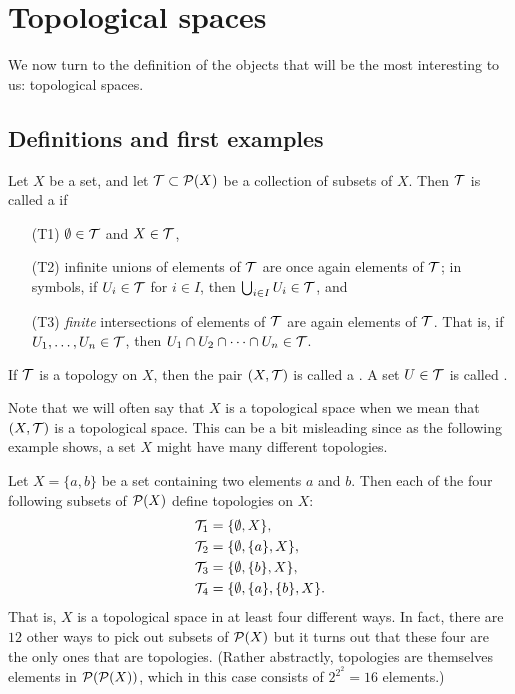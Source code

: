 \section{Topological spaces}
\label{topological-spaces}
We now turn to the definition of the objects that will be the most interesting to us: topological spaces.

\subsection{Definitions and first examples}
\begin{defn}
  Let $X$ be a set, and let $\mathcal{T} \subset \mathcal{P}(X)$ be a collection of subsets of $X$. Then $\mathcal{T}$ is called a  if
  \begin{enumerate}
    \item[(T1)] $\emptyset \in \mathcal{T}$ and $X \in \mathcal{T}$,
    \item[(T2)] infinite unions of elements of $\mathcal{T}$ are once again elements of $\mathcal{T}$; in symbols, if $U_i \in \mathcal{T}$ for $i \in I$, then $\bigcup_{i \in I} U_i \in \mathcal{T}$, and
    \item[(T3)] \emph{finite} intersections of elements of $\mathcal{T}$ are again elements of $\mathcal{T}$. That is, if $U_1, \dots, U_n \in \mathcal{T}$, then $U_1 \cap U_2 \cap \dots \cap U_n \in \mathcal{T}$.
  \end{enumerate}
  If $\mathcal{T}$ is a topology on $X$, then the pair $(X,\mathcal{T})$ is called a . A set $U \in \mathcal{T}$ is called .
\end{defn}
Note that we will often say that $X$ is a topological space when we mean that $(X,\mathcal{T})$ is a topological space. This can be a bit misleading since as the following example shows, a set $X$ might have many different topologies.
\begin{example}
  \label{two-point-topologies}
  Let $X = \{a,b\}$ be a set containing two elements $a$ and $b$. Then each of the four following subsets of $\mathcal{P}(X)$ define topologies on $X$:
  \begin{align*}
    \mathcal{T}_1 &= \{\emptyset,X\},\\
    \mathcal{T}_2 &= \{\emptyset, \{a\}, X\},\\
    \mathcal{T}_3 &= \{\emptyset, \{b\}, X\}, \\
    \mathcal{T}_4 &= \{\emptyset,\{a\},\{b\},X\}.
  \end{align*}
  That is, $X$ is a topological space in at least four different ways. In fact, there are $12$ other ways to pick out subsets of $\mathcal{P}(X)$ but it turns out that these four are the only ones that are topologies. (Rather abstractly, topologies are themselves elements in $\mathcal{P}(\mathcal{P}(X))$, which in this case consists of $2^{2^2} = 16$ elements.)
\end{example}
